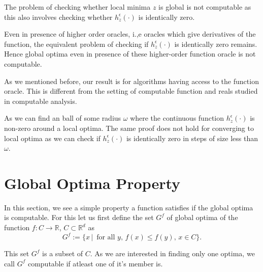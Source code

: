 	
	\begin{corollary}
		The problem of checking whether local minima $z$ is global is not computable as this also involves checking whether $h_z^{\epsilon}(\cdot)$ is identically zero.
	\end{corollary}
	
	\begin{remark}
		Even in presence of higher order oracles, i.,e oracles which give derivatives of the function, the equivalent problem of checking if $h_z^{\epsilon}(\cdot)$ is identically zero remains. Hence global optima even in presence of these higher-order function oracle is not computable. %
	\end{remark}
	
	\begin{remark}
		As we mentioned before, our result is for algorithms having access to the function oracle. This is different from the setting of computable function and reals studied in computable analysis. \cite{pour}
	\end{remark}
	
	\begin{remark}
		As we can find an ball of some radius $\omega$ where the continuous function $h_z^{\epsilon}(\cdot)$ is non-zero around a local optima. The same proof does not hold for converging to local optima as we can check if $h_z^{\epsilon}(\cdot)$ is identically zero in steps of size less than $\omega$.
	\end{remark}
	
	\section{Global Optima Property}
	In this section, we see a simple property a function satisfies if the global optima is computable. For this let us first define the set $G^f$ of global optima of the function $f:C\rightarrow \mathbb{R}$, $C\subset \mathbb{R}^d$ as
	\[ G^f := \{x\,| \, \mbox{ for all } y, \, f(x) \leq f(y), \, x \in C \}.\]
	
	This set $G^f$ is a subset of $C$. As we are interested in finding only one optima, we call $G^f$ computable if atleast one of it's member is. %
	
